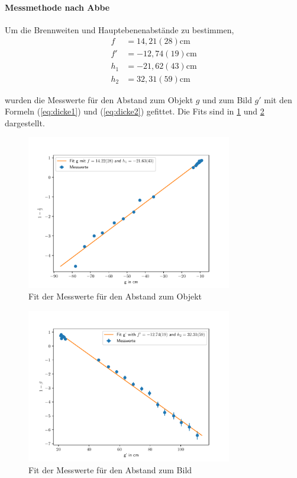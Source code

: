 \documentclass[11pt, a4paper]{article}
\begin{document}
    \paragraph{Messmethode nach Abbe}
    Um die Brennweiten und Hauptebenenabstände zu bestimmen,
    \begin{align}
        f &= 14,21(28) \si{\centi\metre} \\
        f' &= -12,74(19) \si{\centi\metre} \\
        h_1 &= -21,62(43) \si{\centi\metre} \\
        h_2 &= 32,31(59) \si{\centi\metre}
    \end{align}
    
    wurden die Messwerte für den Abstand zum Objekt $g$ und zum Bild $g'$ mit den Formeln (\ref{eq:dicke1}) und (\ref{eq:dicke2}) gefittet. Die Fits sind in \ref{fig:fit1} und \ref{fig:fit2} dargestellt.

    \begin{figure}[h]
        \centering
        \includegraphics[width=0.8\textwidth]{g.pdf}
        \caption{Fit der Messwerte für den Abstand zum Objekt}
        \label{fig:fit1}
    \end{figure}

    \begin{figure}[h]
        \centering
        \includegraphics[width=0.8\textwidth]{g_prime.pdf}
        \caption{Fit der Messwerte für den Abstand zum Bild}
        \label{fig:fit2}
    \end{figure}
\end{document}
